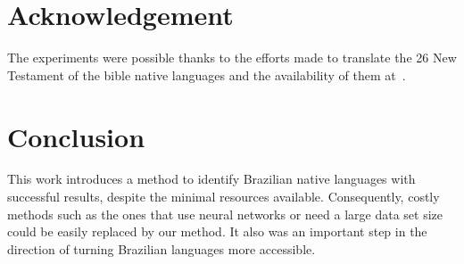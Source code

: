 \documentclass[12pt]{article}
\begin{document}
\section{Acknowledgement}
    The experiments were possible thanks to the efforts made to translate the 26 New Testament of the bible native languages and the availability of them at~\cite{angelo}.
    
\section{Conclusion}\label{sec:conclusion}


This work introduces a method to identify Brazilian native languages with successful results, despite the minimal resources available.
Consequently, costly methods such as the ones that use neural networks or need a large data set size could be easily replaced by our method.
It also was an important step in the direction of turning  Brazilian languages more accessible. 




\end{document}
